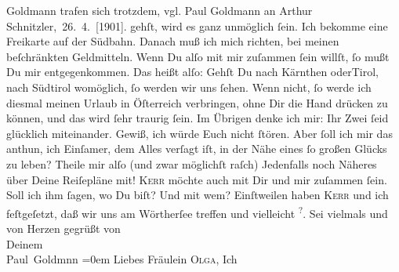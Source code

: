 \begin{ledgroupsized}[t]{13cm}
{{{                     Goldmann trafen sich trotzdem, vgl. Paul Goldmann an Arthur Schnitzler, 26. 4. [1901].}}}\label{K_L03071-1h} gehſt, wird es
               ganz unmöglich ſein. Ich bekomme eine Freikarte auf der Südbahn. Danach muß ich mich richten, bei meinen beſchränkten
               Geldmitteln. Wenn Du alſo mit mir {\pb}zuſammen ſein
               willſt, ſo mußt Du mir entgegenkommen. Das heißt alſo: Gehſt Du nach \introOben{}Kärnthen oder\introOben{}{ }Tirol, nach Südtirol womöglich, ſo werden wir uns ſehen. Wenn  nicht, ſo werde ich diesmal meinen Urlaub in Öſterreich verbringen, ohne Dir die Hand drücken zu können, und das wird
               ſehr traurig ſein. Im Übrigen denke ich mir: Ihr Zwei ſeid glücklich miteinander.
               Gewiß, ich würde Euch nicht ſtören. Aber ſoll ich mir das anthun, ich Einſamer, {\pb}dem Alles verſagt iſt, in der Nähe eines ſo großen
               Glücks zu leben?\pend
           \pstart
           Theile mir alſo \introOben{}(und zwar möglichſt raſch)\introOben{}{ } Jedenfalls noch Näheres über Deine Reiſepläne mit! \textsc{Kerr} möchte auch mit Dir und mir zuſammen ſein. Soll ich ihm ſagen, wo Du biſt? Und
               mit wem? Einſtweilen haben \textsc{Kerr} und ich feſtgeſetzt, daß wir uns am Wörtherſee treffen und vielleicht \label{K_L03071-2v}\label{K_L03071-2h}\substVorne{}\textsuperscript{?}\substDazwischen{}.\substHinten{}\pend
           \pstart
           {\pb}Sei vielmals und von Herzen gegrüßt von {\\[\baselineskip]}Deinem {\\[\baselineskip]}\spacefill\mbox{Paul Goldmnn}\pend
           \leftskip=0em{}{\bigskip}\pstart
           \noindent{}Liebes Fräulein \textsc{Olga}, Ich

\end{ledgroupsized}
